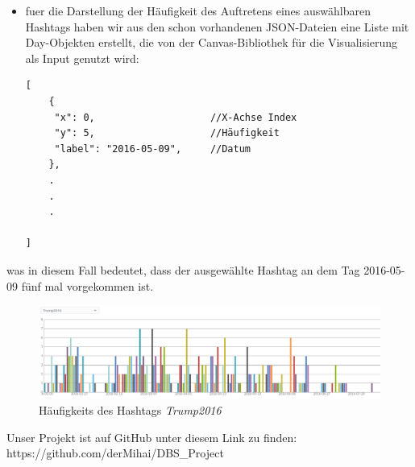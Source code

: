 \documentclass[paper=a4, english, ngerman, romanian]{scrartcl}
\begin{document}
\begin{itemize}
\begin{itemize}
\begin{figure}[H]
		\end{figure}
\item fuer die Darstellung der Häufigkeit des Auftretens eines auswählbaren Hashtags haben wir aus den schon vorhandenen JSON-Dateien eine Liste mit Day-Objekten erstellt, die von der Canvas-Bibliothek für die Visualisierung als Input genutzt wird:
\begin{lstlisting}
[
	{
     "x": 0, 					//X-Achse Index
     "y": 5,					//Häufigkeit
     "label": "2016-05-09",		//Datum
	},
	.
	.
	.
	
]
				\end{lstlisting}
 
\end{itemize}
was in diesem Fall bedeutet, dass der ausgewählte Hashtag an dem Tag  2016-05-09 fünf mal vorgekommen ist.\\

		\begin{figure}[H]
			\centering
			\caption{Häufigkeits des Hashtags \textit{Trump2016}}
			\includegraphics[scale=0.32]{src/Trump2016}
			
		\end{figure}
\vspace*{\fill}

Unser Projekt ist auf GitHub unter diesem Link zu finden: https://github.com/derMihai/DBS\_Project

  

			\end{itemize}
	
\end{document}
